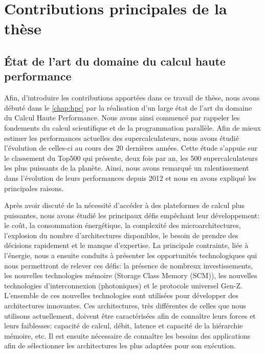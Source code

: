\section{Contributions principales de la thèse}
 

    \subsection{État de l'art du domaine du calcul haute performance}
        
        Afin, d'introduire les contributions apportées dans ce travail de thèse, nous avons débuté dans le \autoref{chap:hpc} par la réalisation d'un large état de l'art du domaine du Calcul Haute Performance. Nous avons ainsi commencé par rappeler les fondements du calcul scientifique et de la programmation parallèle. Afin de mieux estimer les performances actuelles des supercalculateurs, nous avons étudié l'évolution de celles-ci au cours des 20 dernières années. Cette étude s'appuie sur le classement du Top500 qui présente, deux fois par an, les 500 supercalculateurs les plus puissants de la planète. Ainsi, nous avons remarqué un ralentissement dans l'évolution de leurs performances depuis 2012 et nous en avons expliqué les principales raisons. 
        
        Après avoir discuté de la nécessité d'accéder à des plateformes de calcul plus puissantes, nous avons étudié les principaux défis empêchant leur développement: le coût, la consommation énergétique, la complexité des microarchitectures, l'explosion du nombre d'architectures disponibles, le besoin de prendre des décisions rapidement et le manque d'expertise. 
        La principale contrainte, liée à l'énergie, nous a ensuite conduits à présenter les opportunités technologiques qui nous permettront de relever ces défis: la présence de nombreux investissements, les nouvelles technologies mémoire (Storage Class Memory (SCM)), les nouvelles technologies d'interconnexion (photoniques) et le protocole universel Gen-Z.
        L'ensemble de ces nouvelles technologies sont utilisées pour développer des architectures innovantes. Ces architectures, très différentes de celles que nous utilisons actuellement, doivent être caractérisées afin de connaître leurs forces et leurs faiblesses: capacité de calcul, débit, latence et capacité de la hiérarchie mémoire, etc. Il est ensuite nécessaire de connaître les besoins des applications afin de sélectionner les architectures les plus adaptées pour son exécution. 
        

